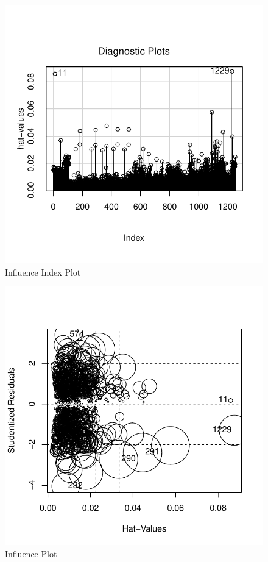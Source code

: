 \documentclass[
]{article}
\begin{document}
\begin{figure}
\centering
\includegraphics{D2P-Report_files/figure-latex/fig12-1.pdf}
\caption{\label{fig:figs12}Influence Index Plot}
\end{figure}

\begin{figure}
\centering
\includegraphics{D2P-Report_files/figure-latex/fig13-1.pdf}
\caption{\label{fig:figs13}Influence Plot}
\end{figure}
\end{document}
